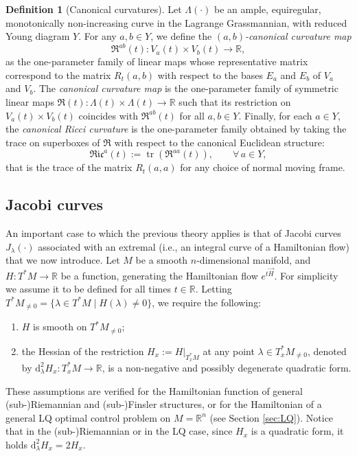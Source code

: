 \documentclass[11pt,a4paper]{article}
\theoremstyle{plain}
\theoremstyle{definition}
\newtheorem{definition}[theorem]{Definition}
\theoremstyle{remark}
\numberwithin{equation}{section}
\newcommand{\R}{\mathbb{R}} %
\DeclareMathOperator{\tr}{\mathrm{tr}}
\newcommand{\di}{\mathrm{d}}
\begin{document}
\begin{definition}[Canonical curvatures]\label{def:cancurv}
Let $\Lambda(\cdot)$ be an ample, equiregular, monotonically non-increasing curve in the Lagrange Grassmannian, with reduced Young diagram $Y$. For any $a,b\in Y$, we define the $(a,b)$\emph{-canonical curvature map}
\begin{equation}
\mathfrak{R}^{ab}(t) : V_a(t)\times V_b(t)\to \R,
\end{equation}
as the one-parameter family of linear maps whose representative matrix correspond to the matrix $R_t(a,b)$ with respect to the bases $E_a$ and $E_b$ of $V_a$ and $V_b$. The \emph{canonical curvature map} is the one-parameter family of symmetric linear maps $\mathfrak{R}(t): \Lambda(t)\times  \Lambda(t)\to \R$ such that its restriction on $V_a(t)\times V_b(t)$ coincides with $\mathfrak{R}^{ab}(t)$ for all $a,b\in Y$. Finally, for each $a\in Y$, the \emph{canonical Ricci curvature} is the one-parameter family obtained by taking the trace on superboxes of $\mathfrak{R}$ with respect to the canonical Euclidean structure:
\begin{equation}
\mathfrak{Ric}^a(t):=\tr(\mathfrak{R}^{aa}(t)),\qquad  \forall\, a\in Y,
\end{equation}
that is the trace of the matrix $R_t(a,a)$ for any choice of normal moving frame.
\end{definition}




\subsection{Jacobi curves}\label{sec:Jaccurve}

An important case to which the previous theory applies is that of Jacobi curves $J_\lambda(\cdot)$ associated with an extremal (i.e., an integral curve of a Hamiltonian flow) that we now introduce. Let $M$ be a smooth $n$-dimensional manifold, and $H:T^*M \to \R$ be a function, generating the Hamiltonian flow $e^{t\vec{H}}$. For simplicity we assume it to be defined for all times $t\in \R$. Letting $T^*M_{\neq 0} = \{ \lambda \in T^*M \mid H(\lambda) \neq 0\}$, we require the following:
\begin{enumerate}[label=(H\arabic*)]
\item\label{h1} $H$ is smooth on $T^*M_{\neq 0}$;
\item\label{h2} the Hessian of the restriction $H_x := H|_{T_x^*M}$ at any point $\lambda \in T^*_xM_{\neq 0}$, denoted by $\di^2_\lambda H_x : T_x^*M \to \R$, is a non-negative and possibly degenerate quadratic form.
\end{enumerate}
These assumptions are verified for the Hamiltonian function of general (sub-)Riemannian and (sub-)Finsler structures, or for the Hamiltonian of a general LQ optimal control problem on $M =\mathbb{R}^n$ (see Section \ref{sec:LQ}). Notice that in the (sub-)Riemannian or in the LQ case, since $H_x$ is a quadratic form, it holds $\di^2_\lambda H_x = 2H_x$.
\end{document}
